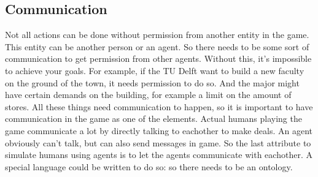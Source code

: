 \subsection{Communication}
Not all actions can be done without permission from another entity in the game. This entity can be another person or an agent. So there needs to be some sort of communication to get permission from other agents. Without this, it's impossible to achieve your goals. For example, if the TU Delft want to build a new faculty on the ground of the town, it needs permission to do so. And the major might have certain demands on the building, for example a limit on the amount of stores. All these things need communication to happen, so it is important to have communication in the game as one of the elements. Actual humans playing the game communicate a lot by directly talking to eachother to make deals. An agent obviously can't talk, but can also send messages in game. So the last attribute to simulate humans using agents is to let the agents communicate with eachother. A special language could be written to do so: so there needs to be an ontology\cite{ontolagents}.
